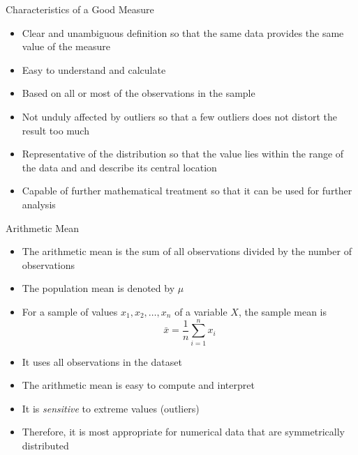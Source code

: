 \documentclass[12pt, aspectratio=169]{beamer}
\begin{document}
    \begin{frame}{Characteristics of a Good Measure}
        \begin{itemize}
            \item Clear and unambiguous definition so that the same data provides the same value of the measure
            \item Easy to understand and calculate
            \item Based on all or most of the observations in the sample
            \item Not unduly affected by outliers so that a few outliers does not distort the result too much
            \item Representative of the distribution so that the value lies within the range of the data and and describe its central location
            \item Capable of further mathematical treatment so that it can be used for further analysis
        \end{itemize}
    \end{frame}


    \begin{frame}{Arithmetic Mean}
        \begin{itemize}
            \item The arithmetic mean is the sum of all observations divided by the number of observations
            \item The population mean is denoted by $\mu$
            \item For a sample of values $x_1, x_2, \dots, x_n$ of a variable $X$, the sample mean is
            \[
                \bar{x} = \frac{1}{n}\sum_{i=1}^{n} x_i
            \]
            \item It uses all observations in the dataset
            \item The arithmetic mean is easy to compute and interpret
            \item It is \textit{sensitive} to extreme values (outliers)
            \item Therefore, it is most appropriate for numerical data that are symmetrically distributed
        \end{itemize}
    \end{frame}
\end{document}
